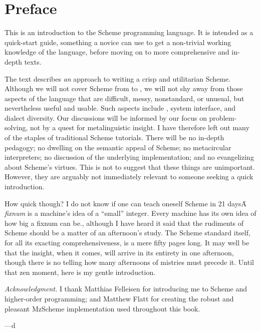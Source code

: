 \chapter*{Preface}

This is an introduction to the Scheme programming
language.  It is intended as a quick-start guide,
something a novice can use to get a non-trivial working
knowledge of the language, before moving on to more
comprehensive and in-depth texts.

The text describes {\em an} approach to writing a crisp
and utilitarian Scheme.  Although we will not cover
Scheme from  to , we will not shy away
from those aspects of the language that are difficult,
messy, nonstandard, or unusual, but nevertheless useful
and usable.  Such aspects include
, system
interface, and dialect diversity.   Our
discussions will be informed by our focus on
problem-solving, not by a quest for metalinguistic
insight.  I have therefore left out many of the staples
of traditional Scheme tutorials.  There will be no
in-depth pedagogy; no dwelling on the semantic appeal
of Scheme; no metacircular interpreters; no discussion
of the underlying implementation; 
and no evangelizing about Scheme's virtues.  This is
not to suggest that these things are unimportant.
However, they are arguably not immediately relevant to
someone seeking a quick introduction.


How quick though?  I do not know if one can teach
oneself Scheme in 21 days\f{A {\em fixnum} is a
machine's idea of a ``small'' integer.  Every machine
has its own idea of how big a fixnum can be.}, although
I have heard it said that the rudiments of Scheme
should be a matter of an afternoon's study.  The Scheme
standard \cite{r5rs} itself, for all its exacting
comprehensiveness, is a mere fifty pages long.  It may
well be that the insight, when it comes, will arrive in
its entirety in one afternoon, though there is no
telling how many afternoons of mistries must precede
it.  Until that zen moment, here is my gentle
introduction.

{\em Acknowledgment.}  I thank Matthias Felleisen for
introducing me to Scheme and higher-order programming;
and Matthew Flatt for creating the robust and
pleasant MzScheme implementation used throughout this
book.

\texonly
\bigbreak
\endtexonly

---d

